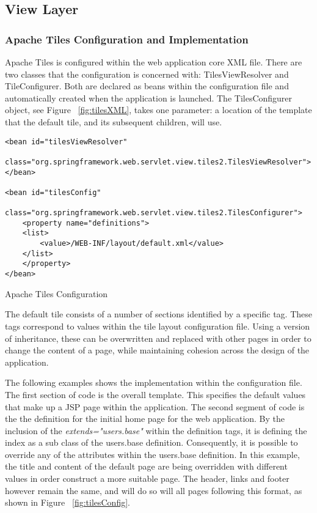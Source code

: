 \subsection{View Layer}
\subsubsection{Apache Tiles Configuration and Implementation}

Apache Tiles is configured within the web application core XML file. There are two classes that the configuration is concerned with: TilesViewResolver and TileConfigurer. Both are declared as beans within the configuration file and automatically created when the application is launched. The TilesConfigurer object, see Figure ~\ref{fig:tilesXML}, takes one parameter: a location of the template that the default tile, and its subsequent children, will use. \newline

\begin{table}[H]
\begin{lstlisting}
<bean id="tilesViewResolver"
	class="org.springframework.web.servlet.view.tiles2.TilesViewResolver">
</bean>

<bean id="tilesConfig"
	class="org.springframework.web.servlet.view.tiles2.TilesConfigurer">
	<property name="definitions">
	<list>
		<value>/WEB-INF/layout/default.xml</value>
	</list>
	</property>
</bean>
\end{lstlisting}
\caption{Apache Tiles Configuration}
\label{fig:tilesXML}
\end{table}

The default tile consists of a number of sections identified by a specific tag. These tags correspond to values within the tile layout configuration file. Using a version of inheritance, these can be overwritten and replaced with other pages in order to change the content of a page, while maintaining cohesion across the design of the application. 

The following examples shows the implementation within the configuration file. The first section of code is the overall template. This specifies the default values that make up a JSP page within the application. The second segment of code is the the definition for the initial home page for the web application. By the inclusion of the \textit{extends="users.base"} within the definition tags, it is defining the index as a sub class of the users.base definition. Consequently, it is possible to override any of the attributes within the users.base definition. In this example, the title and content of the default page are being overridden with different values in order construct a more suitable page. The header, links and footer however remain the same, and will do so will all pages following this format, as shown in Figure ~\ref{fig:tilesConfig}.

